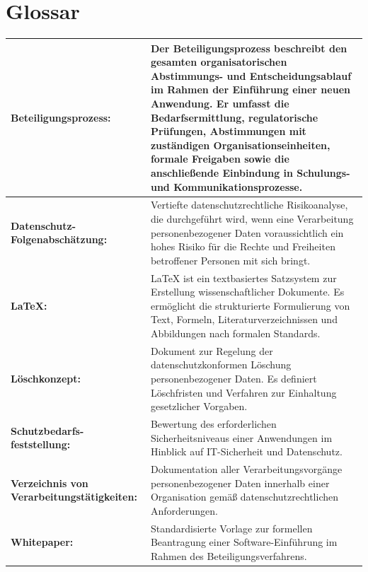 \documentclass[
    12pt, 
    a4paper,
    ]{scrartcl} %
\begin{document}
\section*{Glossar}  
\vspace{0.6cm}
\begin{tabular}{p{4cm} p{11.35cm}}   
    \textbf{\normalsize Beteiligungsprozess:} & \normalsize Der Beteiligungsprozess beschreibt den gesamten organisatorischen Abstimmungs- und Entscheidungsablauf im Rahmen der Einführung einer neuen Anwendung. Er umfasst die Bedarfsermittlung, regulatorische Prüfungen, Abstimmungen mit zuständigen Organisationseinheiten, formale Freigaben sowie die anschließende Einbindung in Schulungs- und Kommunikationsprozesse.\footnotemark[30]\\[0.5cm]
    \hline
    \textbf{\normalsize Datenschutz-Folgenabschätzung:} & \normalsize Vertiefte datenschutzrechtliche Risikoanalyse, die durchgeführt wird, wenn eine Verarbeitung personenbezogener Daten voraussichtlich ein hohes Risiko für die Rechte und Freiheiten betroffener Personen mit sich bringt.\footnotemark[31]\\[0.5cm]
    \hline
    \textbf{\normalsize LaTeX:} & \normalsize LaTeX ist ein textbasiertes Satzsystem zur Erstellung wissenschaftlicher Dokumente. Es ermöglicht die strukturierte Formulierung von Text, Formeln, Literaturverzeichnissen und Abbildungen nach formalen Standards.\footnotemark[32]\\[0.5cm]
    \hline
    \textbf{\normalsize Löschkonzept:} & \normalsize Dokument zur Regelung der datenschutzkonformen Löschung personenbezogener Daten. Es definiert Löschfristen und Verfahren zur Einhaltung gesetzlicher Vorgaben.\footnotemark[34]\\[0.5cm]
    \hline
    \textbf{\normalsize Schutzbedarfs-feststellung:} & \normalsize Bewertung des erforderlichen Sicherheitsniveaus einer Anwendungen im Hinblick auf IT-Sicherheit und Datenschutz.\footnotemark[35]\\[0.5cm]
    \hline
    \textbf{\normalsize Verzeichnis von Verarbeitungstätigkeiten:} & \normalsize Dokumentation aller Verarbeitungsvorgänge personenbezogener Daten innerhalb einer Organisation gemäß datenschutzrechtlichen Anforderungen.\footnotemark[36]\\[0.5cm]
    \hline
    \textbf{\normalsize Whitepaper:} & \normalsize Standardisierte Vorlage zur formellen Beantragung einer Software-Einführung im Rahmen des Beteiligungsverfahrens.\footnotemark[37]\\[0.5cm]

\end{tabular}
\end{document}
